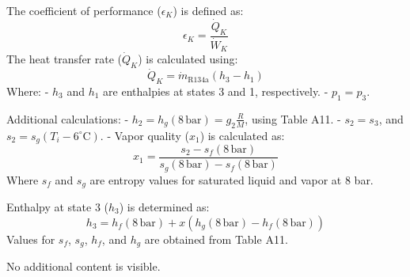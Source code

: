 The coefficient of performance (\(\epsilon_K\)) is defined as:  
\[
\epsilon_K = \frac{\dot{Q}_K}{\dot{W}_K}
\]  
The heat transfer rate (\(\dot{Q}_K\)) is calculated using:  
\[
\dot{Q}_K = \dot{m}_{\text{R134a}} \left( h_3 - h_1 \right)
\]  
Where:  
- \(h_3\) and \(h_1\) are enthalpies at states 3 and 1, respectively.  
- \(p_1 = p_3\).  

Additional calculations:  
- \(h_2 = h_g(8 \, \text{bar}) = g_2 \frac{R}{M}\), using Table A11.  
- \(s_2 = s_3\), and \(s_2 = s_g(T_i - 6^\circ\text{C})\).  
- Vapor quality (\(x_1\)) is calculated as:  
\[
x_1 = \frac{s_2 - s_f(8 \, \text{bar})}{s_g(8 \, \text{bar}) - s_f(8 \, \text{bar})}
\]  
Where \(s_f\) and \(s_g\) are entropy values for saturated liquid and vapor at 8 bar.  

Enthalpy at state 3 (\(h_3\)) is determined as:  
\[
h_3 = h_f(8 \, \text{bar}) + x \left( h_g(8 \, \text{bar}) - h_f(8 \, \text{bar}) \right)
\]  
Values for \(s_f\), \(s_g\), \(h_f\), and \(h_g\) are obtained from Table A11.  

No additional content is visible.